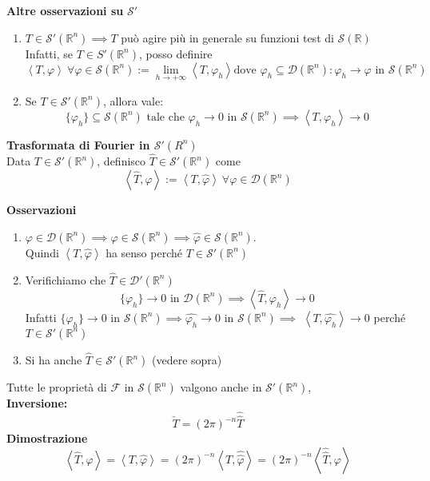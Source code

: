 \documentclass[a4paper]{article}
\newcommand{\R}{\mathbb{R}}
\begin{document}
\textbf{Altre osservazioni su }$\mathcal S'$ 
\begin{enumerate}
	\item $T\in \mathcal S'(\R^n)\implies T$ può agire più in generale su funzioni test di $\mathcal S(\R)$
		\\Infatti, se $T\in S'(\R^n)$, posso definire 
		\[\left< T,\varphi \right> \ \forall \varphi \in \mathcal S(\R^n):=\lim_{h \to +\infty} \left< T,\varphi_h \right> \text{dove }\varphi_h \subseteq  \mathcal D(\R^n):\varphi_h\to \varphi\text{ in }\mathcal S(\R^n)\]
	\item Se $T\in \mathcal S '(\R^n)$, allora vale:
		\[\{\varphi_h\} \subseteq  \mathcal S(\R^n)\text{ tale che }\varphi_h\to 0\text{ in }\mathcal S( \R^n)\implies \left< T,\varphi_h \right> \to 0\]

\end{enumerate}
\begin{tcolorbox}
	\textbf{Trasformata di Fourier in $\mathcal S'(R^n)$}
	\\Data $T \in \mathcal S'(\R^n)$, definisco $\hat{T}\in \mathcal S'(\R^n)$ come
	\[\left< \hat{T}, \varphi \right> :=\left< T,\hat{\varphi} \right> \ \forall \varphi \in  \mathcal D(\R^n)\]

\end{tcolorbox}
\textbf{Osservazioni} 
\begin{enumerate}
	\item $\varphi \in \mathcal D(\R^n)\implies \varphi \in \mathcal S(\R^n)\implies \hat{\varphi}\in \mathcal S(\R^n)$. \\Quindi $\left< T, \hat{\varphi} \right> $ ha senso perché $T\in \mathcal S'(\R^n)$ 
	\item Verifichiamo che $\hat{T} \in \mathcal D'(\R^n)$ 
	\[\{\varphi_h\}\to 0\text{ in }\mathcal D(\R^n)\implies \left< \hat{T}, \varphi_h \right> \to 0 \]
		Infatti $\{\varphi_h\} \to 0$ in $\mathcal S(\R^n)\implies \hat{\varphi_h}\to 0\text{ in }\mathcal S(\R^n)\implies $ $\left< T,\hat{\varphi_h} \right> \to 0$ perché $T\in \mathcal S'(\R^n)$ 
	\item Si ha anche $\hat{ T}\in \mathcal S'(\R^n)$ (vedere sopra)
\end{enumerate}
Tutte le proprietà di $\mathcal F$ in $\mathcal S(\R^n)$ valgono anche in $\mathcal S'(\R^n)$,  
\\\textbf{Inversione:}
\[\check{T}=(2\pi)^{-n}\hat{\hat{T}}\]
\textbf{Dimostrazione}
\[\left< \hat{T},\varphi \right> =\left< T,\hat{\varphi} \right> =(2\pi)^{-n}\left< T,\hat{\hat{\varphi }}\right> = (2\pi)^{-n} \left< \hat{\hat{T}},\varphi \right> \]
\end{document}
